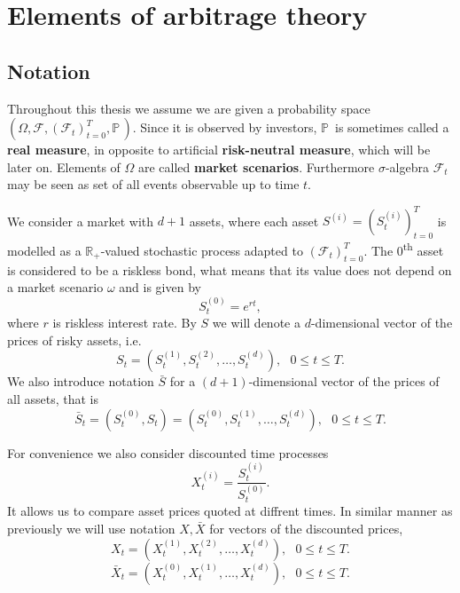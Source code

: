\documentclass[a4paper,12pt, twoside]{book}
\theoremstyle{definition}
\theoremstyle{remark}
\def\P{{\mathbb{P}}\,}
\def\R{{\mathbb{R}}}
\def\Sa{\bar{S}}
\def\Xa{\bar{X}}
\begin{document}
\section{Elements of arbitrage theory}

\subsection{Notation}
Throughout this thesis we assume we are given a probability space $(\Omega, \mathcal{F}, (\mathcal{F}_t)_{t=0}^T, \P)$. Since it is observed by investors, $\P$ is sometimes called a \textbf{real measure}, in opposite to artificial \textbf{risk-neutral measure}, which will be later on. Elements of $\Omega$ are called \textbf{market scenarios}. Furthermore $\sigma$-algebra $\mathcal{F}_t$ may be seen as set of all events observable up to time $t$.

We consider a market with $d+1$ assets, where each asset $S^{(i)} = (S^{(i)}_t)_{t=0}^T$ is modelled as a $\R_+$-valued stochastic process adapted to $(\mathcal{F}_t)_{t=0}^T$. The $0$\textsuperscript{th} asset is considered to be a riskless bond, what means that its value does not depend on a market scenario $\omega$ and is given by 
\[S^{(0)}_t = e^{rt},\]
where $r$ is riskless interest rate. By $S$ we will denote a $d$-dimensional vector of the prices of risky assets, i.e.
\begin{equation*}
 S_t = (S^{(1)}_t, S^{(2)}_t, \ldots, S^{(d)}_t), \ \ \ 0 \leq t \leq T.
\end{equation*}
We also introduce notation $\Sa$ for a $(d+1)$-dimensional vector of the prices of all assets, that is
\begin{equation*}
 \Sa_t = (S^{(0)}_t, S_t) = (S^{(0)}_t, S^{(1)}_t, \ldots, S^{(d)}_t), \ \ \ 0 \leq t \leq T.
\end{equation*}

For convenience we also consider discounted time processes
\[ X^{(i)}_t = \frac{S^{(i)}_t}{S^{(0)}_t}. \]
It allows us to compare asset prices quoted at diffrent times. In similar manner as previously we will use notation $X, \Xa$ for vectors of the discounted prices,
\begin{equation*}
 X_t = (X^{(1)}_t, X^{(2)}_t, \ldots, X^{(d)}_t), \ \ \ 0 \leq t \leq T.
\end{equation*}
\begin{equation*}
 \Xa_t = (X^{(0)}_t, X^{(1)}_t, \ldots, X^{(d)}_t), \ \ \ 0 \leq t \leq T.
\end{equation*}
\end{document}
